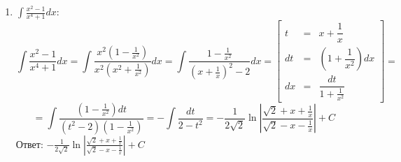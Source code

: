 \documentclass[a4paper,12pt]{article}
\begin{document}
\begin{enumerate}
    \item $\int\frac{x^2 - 1}{x^4 + 1}dx$:
    $$\int\frac{x^2 - 1}{x^4 + 1}dx = \int\frac{x^2(1 - \frac{1}{x^2})}{x^2(x^2 + \frac{1}{x^2})}dx = \int\frac{1 - \frac{1}{x^2}}{(x + \frac{1}{x})^2 - 2}dx = \left[\begin{array}{rcl}
        t & = & x + \dfrac{1}{x} \\
        dt & = & (1 + \dfrac{1}{x^2})dx \\
        dx & = & \dfrac{dt}{1 + \frac{1}{x^2}}
    \end{array}\right] =$$
    $$= \int\frac{(1-\frac{1}{x^2})dt}{(t^2-2)(1-\frac{1}{x^2})} = -\int\frac{dt}{2 - t^2} = -\frac{1}{2\sqrt{2}}\ln\left|\frac{\sqrt{2} + x + \frac{1}{x}}{\sqrt{2} - x - \frac{1}{x}}\right| + C$$
    Ответ: $-\frac{1}{2\sqrt{2}}\ln\left|\frac{\sqrt{2} + x + \frac{1}{x}}{\sqrt{2} - x - \frac{1}{x}}\right| + C$
\end{enumerate}
\end{document}
